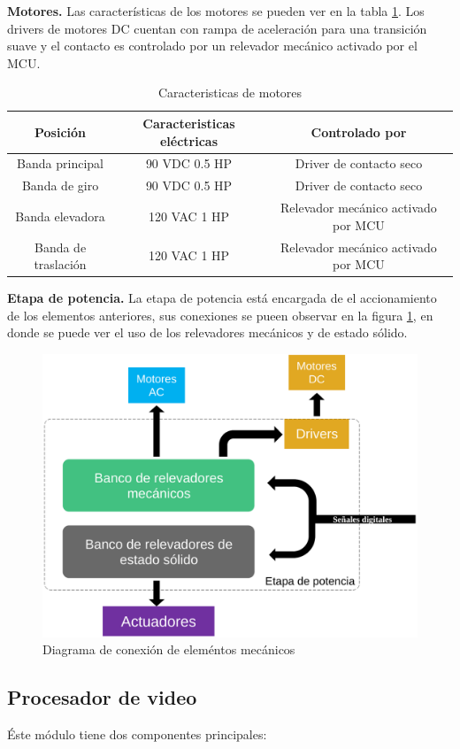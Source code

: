 \documentclass[twoside,spanish,ESP,MSc]{plantillaLabUPV}
\theoremstyle{definition}
\begin{document}
\checkmark\textbf{Motores.} Las características de los motores se pueden ver en la tabla \ref{motorestab}. Los drivers de motores DC cuentan con rampa de aceleración para una transición suave y el contacto es controlado por un relevador mecánico activado por el MCU.

\begin{table}[!tbh]
	\caption{Caracteristicas de motores}
	\label{motorestab}
\begin{tabular}{ccc}
	\textbf{Posición} & \textbf{Caracteristicas eléctricas} & \textbf{Controlado por} \\ 
	\hline 
	Banda principal & 90 VDC 0.5 HP & Driver de contacto seco \\ 
	\hline 
	Banda de giro & 90 VDC 0.5 HP & Driver de contacto seco \\ 
	\hline 
	Banda elevadora & 120 VAC 1 HP & Relevador mecánico activado por MCU \\ 
	\hline 
	Banda de traslación & 120 VAC 1 HP & Relevador mecánico activado por MCU\\ 
\end{tabular} 
\end{table}




\checkmark\textbf{Etapa de potencia.} La etapa de  potencia está encargada de el accionamiento de los elementos anteriores, sus conexiones se pueen observar en la figura \ref{fig:etapapotencia}, en donde se puede ver el uso de los relevadores mecánicos y de estado sólido.

\begin{figure}
	\centering
	\includegraphics[width=0.7\linewidth]{edrawimas/etapapotencia}
	\caption{Diagrama de conexión de eleméntos mecánicos}
	\label{fig:etapapotencia}
\end{figure}


\subsection{Procesador de video}
Éste módulo tiene dos componentes principales:
\end{document}
